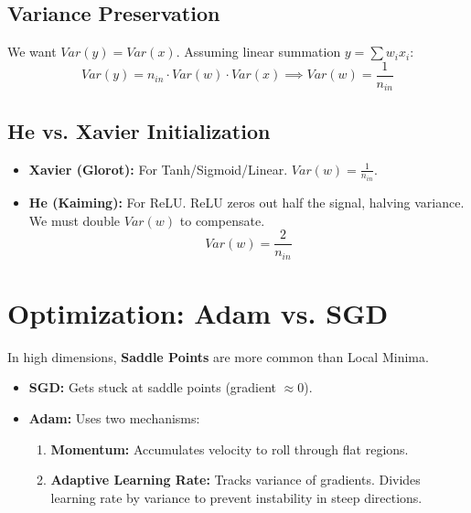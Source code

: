 \documentclass{article}
\begin{document}
\subsection{Variance Preservation}
We want $Var(y) = Var(x)$. Assuming linear summation $y = \sum w_i x_i$:
\begin{equation}
    Var(y) = n_{in} \cdot Var(w) \cdot Var(x) \implies Var(w) = \frac{1}{n_{in}}
\end{equation}

\subsection{He vs. Xavier Initialization}
\begin{itemize}
    \item \textbf{Xavier (Glorot):} For Tanh/Sigmoid/Linear. $Var(w) = \frac{1}{n_{in}}$.
    \item \textbf{He (Kaiming):} For ReLU. ReLU zeros out half the signal, halving variance. We must double $Var(w)$ to compensate.
    \begin{equation}
        Var(w) = \frac{2}{n_{in}}
    \end{equation}
\end{itemize}

\section{Optimization: Adam vs. SGD}
In high dimensions, \textbf{Saddle Points} are more common than Local Minima.
\begin{itemize}
    \item \textbf{SGD:} Gets stuck at saddle points (gradient $\approx 0$).
    \item \textbf{Adam:} Uses two mechanisms:
    \begin{enumerate}
        \item \textbf{Momentum:} Accumulates velocity to roll through flat regions.
        \item \textbf{Adaptive Learning Rate:} Tracks variance of gradients. Divides learning rate by variance to prevent instability in steep directions.
    \end{enumerate}
\end{itemize}
\end{document}
